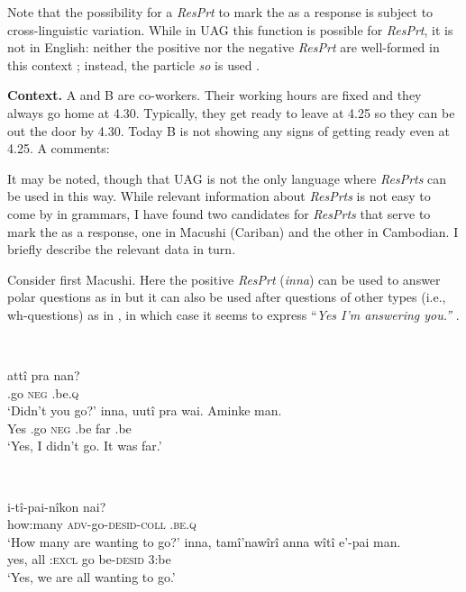 \documentclass[output=paper]{LSP/langsci}
\begin{document}
Note that the possibility for a \textit{ResPrt} to mark the  as a response is subject to cross-linguistic variation. While in UAG this function is possible for \textit{ResPrt}, it is not in English: neither the positive nor the negative \textit{ResPrt} are well-formed in this context ; instead, the particle \textit{so} is used .


\ea\label{ex:wiltschko:76}
 
\textbf{Context.} A and B are co-workers. Their working hours are fixed and they always go home at 4.30. Typically, they get ready to leave at 4.25 so they can be out the door by 4.30. Today B is not showing any signs of getting ready even at 4.25. A comments:\\
    \z
\z

It may be noted, though that UAG is not the only language where \textit{ResPrts} can be used in this way. While relevant information about \textit{ResPrts} is not easy to come by in grammars, I have found two candidates for \textit{ResPrts} that serve to mark the  as a response, one in Macushi (Cariban) and the other in Cambodian. I briefly describe the relevant data in turn. 

Consider first Macushi. Here the positive \textit{ResPrt} (\textit{inna}) can be used to answer polar questions as in  but it can also be used after questions of other types (i.e., wh-questions) as in , in which case it seems to express “\textit{Yes I’m answering you.”} \citep[46--49]{Abbott1991}.


\ea\label{ex:wiltschko:77}
\\
\begin{xlist}
  \gll attî   pra   nan? \\
    .go   \textsc{neg}   .be.\textsc{q}\\
    \glt ‘Didn’t you go?’
    \gll inna,   uutî   pra   wai.   Aminke man.\\
    Yes  .go  \textsc{neg} .be  far   .be\\
    \glt ‘Yes, I didn’t go. It was far.’
\end{xlist}    
\z

\ea\label{ex:wiltschko:78}
\\
\begin{xlist}
  i-tî-pai-nîkon    nai? \\
how:many  \textsc{adv-}go-\textsc{desid-coll}  \textsc{.be.q}\\
\glt ‘How many are wanting to go?’
\gll inna,   tamî’nawîrî  anna  wîtî  e’-pai    man.\\
    yes,  all    :\textsc{excl} go  be-\textsc{desid}  3:be\\
\glt ‘Yes, we are all wanting to go.’
\end{xlist}
\z
\end{document}
